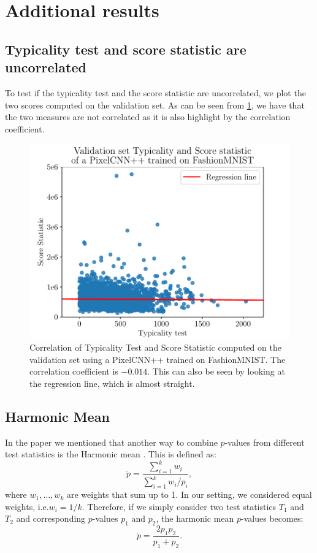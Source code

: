 {\section{Additional results}

\subsection{Typicality test and score statistic are uncorrelated}
\label{appendix_modelagnostic:correlation}
To test if the typicality test and the score statistic are uncorrelated, we plot the two scores computed on the validation set. As can be seen from \cref{fig_modelagnostic:corralation}, we have that the two measures are not correlated as it is also highlight by the correlation coefficient.

\begin{figure}[tb]
    \centering
    \includegraphics[scale=0.5]{graphics/paper_modelagnostic/correlation_correct_font.pdf}
    \caption{Correlation of Typicality Test and Score Statistic computed on the validation set using a PixelCNN++ trained on FashionMNIST. The correlation coefficient is $-0.014$. This can also be seen by looking at the regression line, which is almost straight. }
    \label{fig_modelagnostic:corralation}
\end{figure}


\subsection{Harmonic Mean}
\label{appendix_modelagnostic:harmonic}
In the paper we mentioned that another way to combine $p$-values from different test statistics is the Harmonic mean \citep{wilson_harmonic_2019}. This is defined as:
\begin{equation}
    \mathring{p} = \frac{\sum_{i=1}^{k} w_i}{\sum_{i=1}^{k} w_i / p_i},
\end{equation}
where $w_1,\dots,w_k$ are weights that sum up to 1. In our setting, we considered equal weights, i.e.\@ $w_i = 1 / k$. Therefore, if we simply consider two test statistics $T_1$ and $T_2$ and corresponding $p$-values $p_1$ and $p_2$, the harmonic mean $p$-values becomes:
\begin{equation}
    \mathring{p} = \frac{2 p_1 p_2}{p_1 + p_2}.
\end{equation}

}
